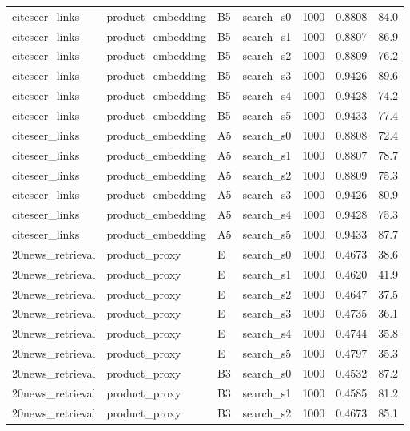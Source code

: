 \begin{longtable}{llllrrr}
\rowcolor{oursbg}
citeseer\_links & product\_embedding & B5 & search\_s0 & 1000 & 0.8808 & 84.0 \\
\rowcolor{oursbg}
citeseer\_links & product\_embedding & B5 & search\_s1 & 1000 & 0.8807 & 86.9 \\
\rowcolor{oursbg}
citeseer\_links & product\_embedding & B5 & search\_s2 & 1000 & 0.8809 & 76.2 \\
\rowcolor{oursbg}
citeseer\_links & product\_embedding & B5 & search\_s3 & 1000 & 0.9426 & 89.6 \\
\rowcolor{oursbg}
citeseer\_links & product\_embedding & B5 & search\_s4 & 1000 & 0.9428 & 74.2 \\
\rowcolor{oursbg}
citeseer\_links & product\_embedding & B5 & search\_s5 & 1000 & 0.9433 & 77.4 \\
citeseer\_links & product\_embedding & A5 & search\_s0 & 1000 & 0.8808 & 72.4 \\
citeseer\_links & product\_embedding & A5 & search\_s1 & 1000 & 0.8807 & 78.7 \\
citeseer\_links & product\_embedding & A5 & search\_s2 & 1000 & 0.8809 & 75.3 \\
citeseer\_links & product\_embedding & A5 & search\_s3 & 1000 & 0.9426 & 80.9 \\
citeseer\_links & product\_embedding & A5 & search\_s4 & 1000 & 0.9428 & 75.3 \\
citeseer\_links & product\_embedding & A5 & search\_s5 & 1000 & 0.9433 & 87.7 \\
20news\_retrieval & product\_proxy & E & search\_s0 & 1000 & 0.4673 & 38.6 \\
20news\_retrieval & product\_proxy & E & search\_s1 & 1000 & 0.4620 & 41.9 \\
20news\_retrieval & product\_proxy & E & search\_s2 & 1000 & 0.4647 & 37.5 \\
20news\_retrieval & product\_proxy & E & search\_s3 & 1000 & 0.4735 & 36.1 \\
20news\_retrieval & product\_proxy & E & search\_s4 & 1000 & 0.4744 & 35.8 \\
20news\_retrieval & product\_proxy & E & search\_s5 & 1000 & 0.4797 & 35.3 \\
20news\_retrieval & product\_proxy & B3 & search\_s0 & 1000 & 0.4532 & 87.2 \\
20news\_retrieval & product\_proxy & B3 & search\_s1 & 1000 & 0.4585 & 81.2 \\
20news\_retrieval & product\_proxy & B3 & search\_s2 & 1000 & 0.4673 & 85.1 \\

\end{longtable}

